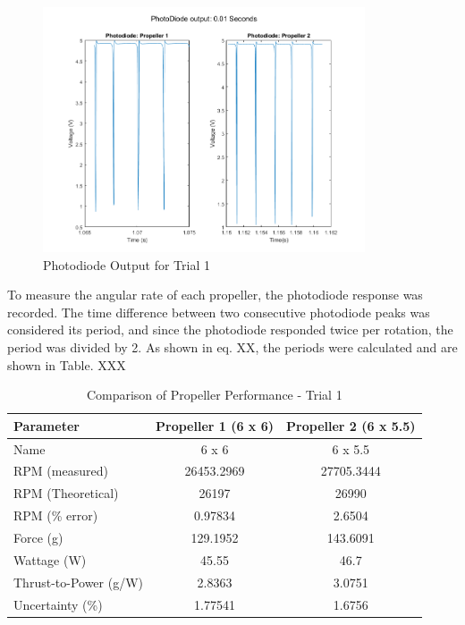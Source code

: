\documentclass{article}
\begin{document}
\begin{figure}[H]
  \centering
  \includegraphics[width = 0.85\textwidth]{finalprojectimages/Trial1_PhotoDiode.png}
  \caption{Photodiode Output for Trial 1}
  \label{fig:photodiode}
\end{figure}

To measure the angular rate of each propeller, the photodiode response was recorded.  The time difference between two consecutive photodiode peaks was considered its period, and since the photodiode responded twice per rotation, the period was divided by 2.  As shown in eq. XX, the periods were calculated and are shown in Table. XXX

\begin{table}[H]
  \centering
  \begin{tabular}{lcc}
  \hline
  \textbf{Parameter} & \textbf{Propeller 1 (6 x 6)} & \textbf{Propeller 2 (6 x 5.5)} \\
  \hline
  Name & 6 x 6 & 6 x 5.5 \\
  RPM (measured) & 26453.2969 & 27705.3444 \\
  RPM (Theoretical) & 26197 & 26990 \\
  RPM (\% error) & 0.97834 & 2.6504 \\
  Force (g) & 129.1952 & 143.6091 \\
  Wattage (W) & 45.55 & 46.7 \\
  Thrust-to-Power (g/W) & 2.8363 & 3.0751 \\
  Uncertainty (\%) & 1.77541 & 1.6756 \\
  \hline
  \end{tabular}
  \caption{Comparison of Propeller Performance - Trial 1}
  \label{table:propeller_comparison1}
  \end{table}
\end{document}
